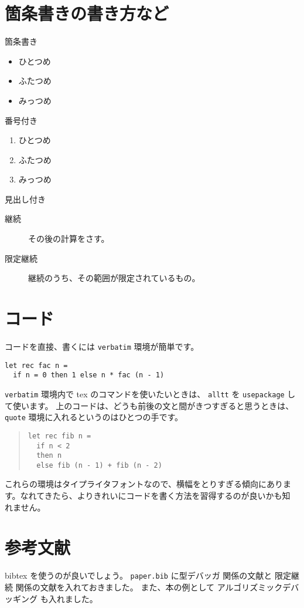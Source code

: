 \documentclass[twoside, twocolumn, a4paper]{jarticle}
\begin{document}
\section{箇条書きの書き方など}\label{sec:kajogaki}
箇条書き
\begin{itemize}
       \item ひとつめ
       \item ふたつめ
       \item みっつめ
\end{itemize}
番号付き
\begin{enumerate}
       \item ひとつめ
       \item ふたつめ
       \item みっつめ
\end{enumerate}
見出し付き
\begin{description}
       \item[継続] その後の計算をさす。
       \item[限定継続] 継続のうち、その範囲が限定されているもの。
\end{description}

\section{コード}\label{sec:code}
コードを直接、書くには \texttt{verbatim} 環境が簡単です。
\begin{verbatim}
let rec fac n =
  if n = 0 then 1 else n * fac (n - 1)
\end{verbatim}
\texttt{verbatim} 環境内で tex のコマンドを使いたいときは、
\texttt{alltt} を \texttt{usepackage} して使います。
上のコードは、どうも前後の文と間がきつすぎると思うときは、
\texttt{quote} 環境に入れるというのはひとつの手です。
\begin{quote}
\begin{verbatim}
let rec fib n =
  if n < 2
  then n
  else fib (n - 1) + fib (n - 2)
\end{verbatim}
\end{quote}

これらの環境はタイプライタフォントなので、横幅をとりすぎる傾向にありま
す。なれてきたら、よりきれいにコードを書く方法を習得するのが良いかも知
れません。

\section{参考文献}\label{sec:bunken}
bibtex を使うのが良いでしょう。
\texttt{paper.bib} に型デバッガ \cite{TA2013} 関係の文献と
限定継続 \cite{DF1989, DF1990} 関係の文献を入れておきました。
また、本の例として
アルゴリズミックデバッギング \cite{Shapiro1983} も入れました。
\end{document}
